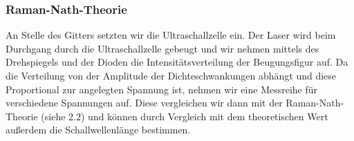\subsubsection{Raman-Nath-Theorie}

An Stelle des Gitters setzten wir die Ultraschallzelle ein. Der Laser wird beim Durchgang durch die Ultraschallzelle gebeugt und wir nehmen mittels des Drehspiegels und der Dioden die Intensitätsverteilung der Beugungsfigur auf. Da die Verteilung von der Amplitude der Dichteschwankungen abhängt und diese Proportional zur angelegten Spannung ist, nehmen wir eine Messreihe für verschiedene Spannungen auf. Diese vergleichen wir dann mit der Raman-Nath-Theorie (siehe 2.2) und können durch Vergleich mit dem theoretischen Wert außerdem die Schallwellenlänge bestimmen.

\clearpage










